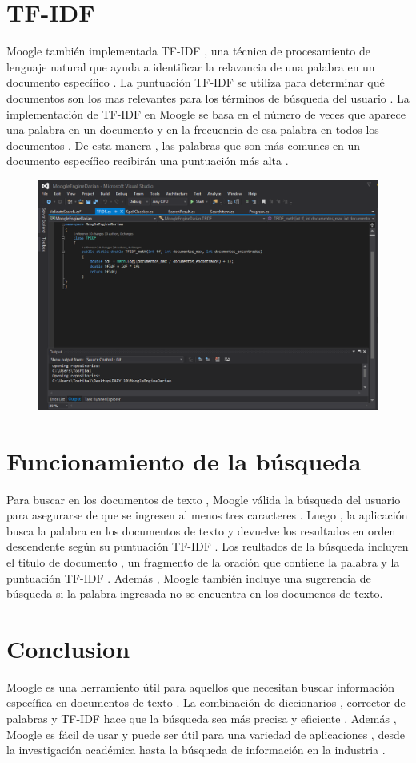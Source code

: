 \documentclass[12pt,a4paper]{article}
\begin{document}
\section{TF-IDF}     
Moogle también implementada TF-IDF , una técnica de procesamiento de lenguaje natural que ayuda a identificar la relavancia de una palabra en un documento específico . La puntuación  TF-IDF se utiliza para determinar qué documentos son los mas relevantes para los términos de búsqueda del usuario . La implementación de TF-IDF en Moogle se basa en el número de veces que aparece una palabra en un documento y en la frecuencia de esa palabra en todos los documentos . De esta manera , las palabras que son más comunes en un documento específico recibirán una puntuación más alta . 
\begin{figure}[H]
\centering
\includegraphics[scale=0.5]{TFIDF}
\end{figure}
\section{Funcionamiento de la búsqueda }
Para buscar en los documentos de texto , Moogle válida la búsqueda del usuario para asegurarse de que se ingresen al menos tres caracteres . Luego , la aplicación busca la palabra en los documentos de texto y devuelve los resultados en orden descendente según su puntuación TF-IDF . Los reultados de la búsqueda incluyen el titulo de documento , un fragmento de la oración que contiene la palabra y la puntuación TF-IDF . Además , Moogle también incluye una sugerencia de búsqueda si la palabra ingresada no se encuentra en los documenos de texto.   
\section{Conclusion}
Moogle es una herramiento útil para aquellos que necesitan buscar información específica en documentos de texto . La combinación de diccionarios , corrector de palabras y TF-IDF hace que la búsqueda sea más precisa y eficiente . Además , Moogle es fácil de usar y puede ser útil para una variedad de aplicaciones  , desde la investigación académica hasta la búsqueda de información en la industria .              
\end{document}
